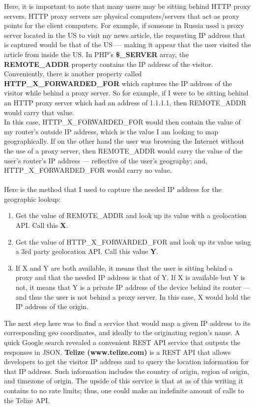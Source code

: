 \documentclass[12pt]{article}
\begin{document}
Here, it is important to note that many users may be sitting behind HTTP proxy servers. HTTP proxy servers are physical computers/servers that act as proxy points for the client computers. For example, if someone in Russia used a proxy server located in the US to visit my news article, the requesting IP address that is captured would be that of the US --- making it appear that the user visited the article from inside the US. In PHP's \textbf{\$\_SERVER} array, the \textbf{REMOTE\_ADDR} property contains the IP address of the visitor. Conveniently, there is another property called \textbf{HTTP\_X\_FORWARDED\_FOR} which captures the IP address of the visitor while behind a proxy server. So for example, if I were to be sitting behind an HTTP proxy server which had an address of 1.1.1.1, then REMOTE\_ADDR would carry that value. \\
In this case, HTTP\_X\_FORWARDED\_FOR would then contain the value of my router's outside IP address, which is the value I am looking to map geographically. If on the other hand the user was browsing the Internet without the use of a proxy server, then REMOTE\_ADDR would carry the value of the user's router's IP address --- reflective of the user's geography; and, HTTP\_X\_FORWARDED\_FOR would carry no value. \\ \\
\noindent Here is the method that I used to capture the needed IP address for the geographic lookup:
\begin{enumerate}
\item Get the value of REMOTE\_ADDR and look up its value with a geolocation API. Call this \textbf{X}.
\item Get the value of HTTP\_X\_FORWARDED\_FOR and look up its value using a 3rd party geolocation API. Call this value \textbf{Y}.
\item If X and Y are both available, it means that the user is sitting behind a proxy and that the needed IP address is that of Y. If X is available but Y is not, it means that Y is a private IP address of the device behind its router --- and thus the user is not behind a proxy server. In this case, X would hold the IP address of the origin.
\end{enumerate} 

The next step here was to find a service that would map a given IP address to its corresponding geo coordinates, and ideally to the originating region's name. A quick Google search revealed a convenient REST API service that outputs the responses in JSON. \textbf{Telize (www.telize.com)} is a REST API that allows developers to get the visitor IP address and to query the location information for that IP address. Such information includes the country of origin, region of origin, and timezone of origin. The upside of this service is that at as of this writing it contains to no rate limits; thus, one could make an indefinite amount of calls to the Telize API.
\end{document}
